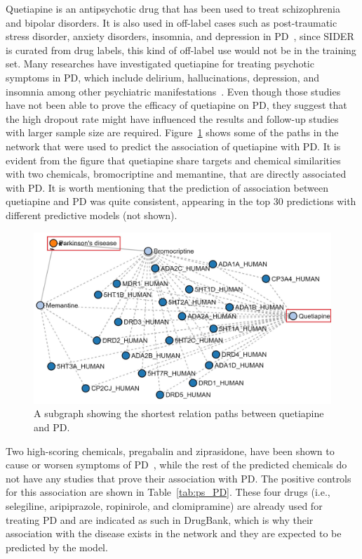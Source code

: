 Quetiapine is an antipsychotic drug that has been used to treat schizophrenia and bipolar disorders.
It is also used in off-label cases such as post-traumatic stress disorder, anxiety disorders, insomnia, and depression in \ac{PD}~\cite{el-saifi_quetiapine_2016}, since SIDER is curated from drug labels, this kind of off-label use would not be in the training set.
Many researches have investigated quetiapine for treating psychotic symptoms in \ac{PD}, which include delirium, hallucinations, depression, and insomnia among other psychiatric manifestations~\cite{desmarais_quetiapine_2016}.
Even though those studies have not been able to prove the efficacy of quetiapine on \ac{PD}, they suggest that the high dropout rate might have influenced the results and follow-up studies with larger sample size are required.
Figure~\ref{fig:parkinson_quetiapine} shows some of the paths in the network that were used to predict the association of quetiapine with \ac{PD}.
It is evident from the figure that quetiapine share targets and chemical similarities with two chemicals, bromocriptine and memantine, that are directly associated with \ac{PD}.
It is worth mentioning that the prediction of association between quetiapine and \ac{PD} was quite consistent, appearing in the top 30 predictions with different predictive models (not shown).

\begin{figure}[h!]
    \centering
    \includegraphics[scale=0.6]
    {figures/parkinson_quetiapine.jpg}
    \caption[Quetiapine's path subgraph in Parkinson's disease]{\label{fig:parkinson_quetiapine} A subgraph showing the shortest relation paths between quetiapine and \ac{PD}.}
\end{figure}

Two high-scoring chemicals, pregabalin and ziprasidone, have been shown to cause or worsen symptoms of \ac{PD}~\cite{perez_lloret_pregabalin-induced_2009, younce_systematic_2019}, while the rest of the predicted chemicals do not have any studies that prove their association with \ac{PD}.
The positive controls for this association are shown in Table~\ref{tab:ps_PD}.
These four drugs (i.e., selegiline, aripiprazole, ropinirole, and clomipramine) are already used for treating \ac{PD} and are indicated as such in DrugBank, which is why their association with the disease exists in the network and they are expected to be predicted by the model.

